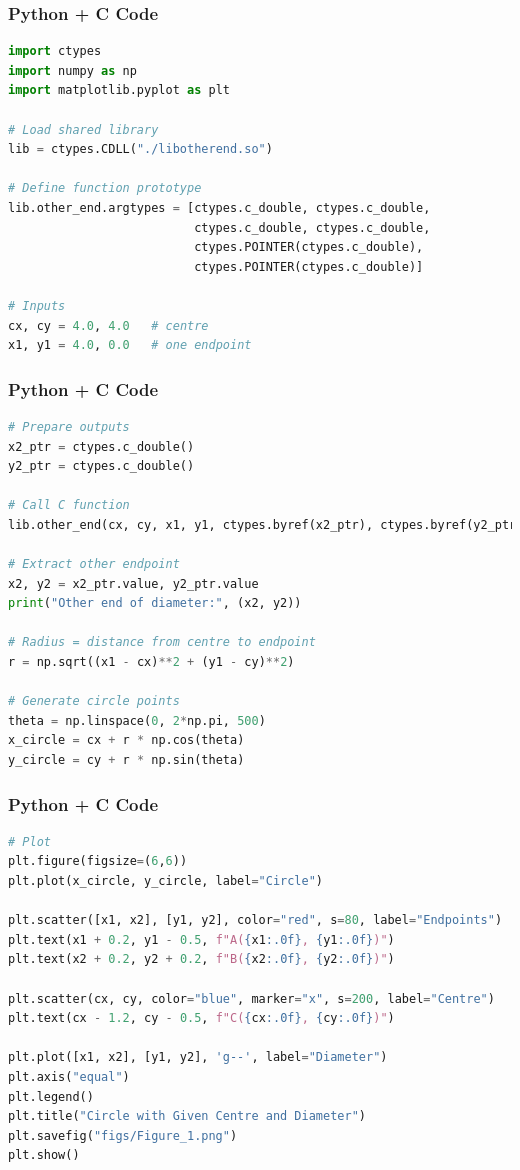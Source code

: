 \documentclass{beamer}
\begin{document}
\begin{frame}[fragile]
    \frametitle{Python + C Code}
    \begin{lstlisting}[language=Python]
import ctypes
import numpy as np
import matplotlib.pyplot as plt

# Load shared library
lib = ctypes.CDLL("./libotherend.so")

# Define function prototype
lib.other_end.argtypes = [ctypes.c_double, ctypes.c_double,
                          ctypes.c_double, ctypes.c_double,
                          ctypes.POINTER(ctypes.c_double), 
                          ctypes.POINTER(ctypes.c_double)]

# Inputs
cx, cy = 4.0, 4.0   # centre
x1, y1 = 4.0, 0.0   # one endpoint
    \end{lstlisting}
\end{frame}

\begin{frame}[fragile]
    \frametitle{Python + C Code}
    \begin{lstlisting}[language=Python]
# Prepare outputs
x2_ptr = ctypes.c_double()
y2_ptr = ctypes.c_double()

# Call C function
lib.other_end(cx, cy, x1, y1, ctypes.byref(x2_ptr), ctypes.byref(y2_ptr))

# Extract other endpoint
x2, y2 = x2_ptr.value, y2_ptr.value
print("Other end of diameter:", (x2, y2))

# Radius = distance from centre to endpoint
r = np.sqrt((x1 - cx)**2 + (y1 - cy)**2)

# Generate circle points
theta = np.linspace(0, 2*np.pi, 500)
x_circle = cx + r * np.cos(theta)
y_circle = cy + r * np.sin(theta)
    \end{lstlisting}
\end{frame}

\begin{frame}[fragile]
    \frametitle{Python + C Code}
    \begin{lstlisting}[language=Python]
# Plot
plt.figure(figsize=(6,6))
plt.plot(x_circle, y_circle, label="Circle")

plt.scatter([x1, x2], [y1, y2], color="red", s=80, label="Endpoints")
plt.text(x1 + 0.2, y1 - 0.5, f"A({x1:.0f}, {y1:.0f})")
plt.text(x2 + 0.2, y2 + 0.2, f"B({x2:.0f}, {y2:.0f})")

plt.scatter(cx, cy, color="blue", marker="x", s=200, label="Centre")
plt.text(cx - 1.2, cy - 0.5, f"C({cx:.0f}, {cy:.0f})")

plt.plot([x1, x2], [y1, y2], 'g--', label="Diameter")
plt.axis("equal")
plt.legend()
plt.title("Circle with Given Centre and Diameter")
plt.savefig("figs/Figure_1.png")
plt.show()
    \end{lstlisting}
\end{frame}
\end{document}
